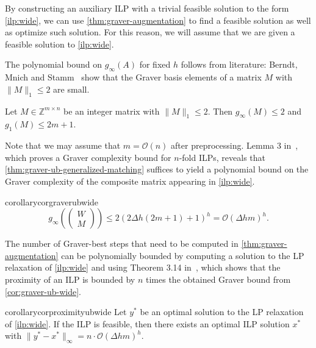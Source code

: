 \documentclass[a4paper,UKenglish,cleveref,thm-restate]{lipics-v2021}
\newcommand{\Z}{\mathbb Z}
\renewcommand{\O}{\mathcal O}
\begin{document}
By constructing an auxiliary ILP with a trivial feasible solution to the form \cref{ilp:wide}, we can use \cref{thm:graver-augmentation} to find a feasible solution as well as optimize such solution. For this reason, we will assume that we are given a feasible solution to \cref{ilp:wide}.

The polynomial bound on $g_\infty(A)$ for fixed $h$ follows from literature: Berndt, Mnich and Stamm~\cite{DBLP:conf/sofsem/BerndtMS24} show that the Graver basis elements of a matrix $M$ with $\|M\|_1\le2$ are small.

\begin{theorem}
    Let $M\in\Z^{m\times n}$ be an integer matrix with $\|M\|_1\le2$. Then $g_\infty(M)\le2$ and $g_1(M)\le2m+1$.
    \label{thm:graver-ub-generalized-matching}
\end{theorem}

Note that we may assume that $m=\O(n)$ after preprocessing. Lemma 3 in~\cite{DBLP:conf/icalp/EisenbrandHK18}, which proves a Graver complexity bound for $n$-fold ILPs, reveals that \cref{thm:graver-ub-generalized-matching} suffices to yield a polynomial bound on the Graver complexity of the composite matrix appearing in \cref{ilp:wide}.

\begin{restatable}{corollary}{corgraverubwide}
    \[
        g_\infty\left(\begin{pmatrix}
            W\\M
        \end{pmatrix}\right)\le2(2\Delta h(2m+1)+1)^h=\O(\Delta hm)^h.
    \]
    \label{cor:graver-ub-wide}
\end{restatable}

The number of Graver-best steps that need to be computed in \cref{thm:graver-augmentation} can be polynomially bounded by computing a solution to the LP relaxation of \cref{ilp:wide} and using Theorem 3.14 in~\cite{DBLP:journals/mp/HemmeckeKW14}, which shows that the proximity of an ILP is bounded by $n$ times the obtained Graver bound from \cref{cor:graver-ub-wide}.

\begin{restatable}{corollary}{corproximityubwide}
    Let $y^*$ be an optimal solution to the LP relaxation of \cref{ilp:wide}. If the ILP is feasible, then there exists an optimal ILP solution $x^*$ with $\|y^*-x^*\|_\infty=n\cdot\O(\Delta hm)^h$.
    \label{cor:proximity-ub-wide}
\end{restatable}
\end{document}
